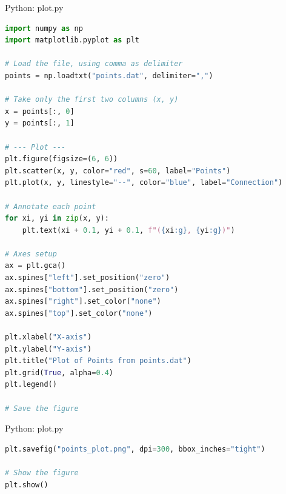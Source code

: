 \documentclass{beamer}
\numberwithin{equation}{section}
\theoremstyle{remark}
\begin{document}
\begin{frame}[fragile]{Python: plot.py}
\begin{lstlisting}[language=Python]
import numpy as np
import matplotlib.pyplot as plt

# Load the file, using comma as delimiter
points = np.loadtxt("points.dat", delimiter=",")

# Take only the first two columns (x, y)
x = points[:, 0]
y = points[:, 1]

# --- Plot ---
plt.figure(figsize=(6, 6))
plt.scatter(x, y, color="red", s=60, label="Points")
plt.plot(x, y, linestyle="--", color="blue", label="Connection")

# Annotate each point
for xi, yi in zip(x, y):
    plt.text(xi + 0.1, yi + 0.1, f"({xi:g}, {yi:g})")

# Axes setup
ax = plt.gca()
ax.spines["left"].set_position("zero")
ax.spines["bottom"].set_position("zero")
ax.spines["right"].set_color("none")
ax.spines["top"].set_color("none")

plt.xlabel("X-axis")
plt.ylabel("Y-axis")
plt.title("Plot of Points from points.dat")
plt.grid(True, alpha=0.4)
plt.legend()

# Save the figure
\end{lstlisting}
\end{frame}
\begin{frame}[fragile]{Python: plot.py }
\begin{lstlisting}[language=Python]
plt.savefig("points_plot.png", dpi=300, bbox_inches="tight")

# Show the figure
plt.show()
\end{lstlisting}
\end{frame}
\end{document}
